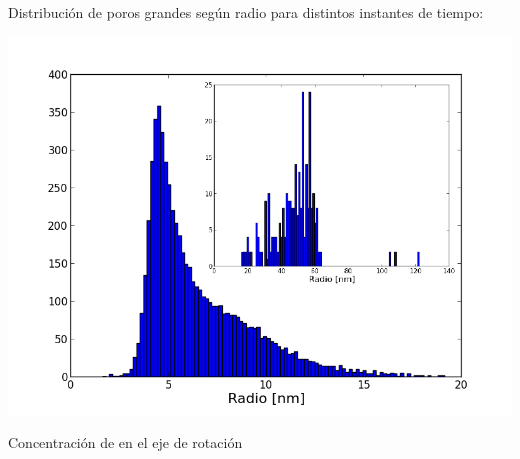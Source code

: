 \documentclass[a0,portrait]{a0poster}
\begin{document}
\begin{multicols}{2}



\begin{multicols}{2}

Distribución de poros grandes según radio para distintos instantes de tiempo:


	\begin{center}\vspace{1cm}
	\includegraphics[width=1\linewidth]{hist-pip}
	\end{center}\vspace{1cm}


\columnbreak

Concentración de \cl en el eje de rotación


\end{multicols}
\end{multicols}
\end{document}

